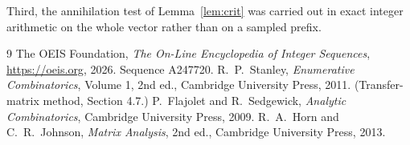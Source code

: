\documentclass[11pt,a4paper]{article}
\theoremstyle{plain}
\theoremstyle{definition}
\begin{document}
Third, the annihilation test of Lemma~\ref{lem:crit} was carried out in exact integer
arithmetic on the whole vector rather than on a sampled prefix.

\begin{thebibliography}{9}
 The OEIS Foundation, \emph{The On-Line Encyclopedia of Integer
Sequences}, \url{https://oeis.org}, 2026. Sequence A247720.
 R.~P.~Stanley, \emph{Enumerative Combinatorics}, Volume 1, 2nd ed.,
Cambridge University Press, 2011. (Transfer-matrix method, Section 4.7.)
 P.~Flajolet and R.~Sedgewick, \emph{Analytic Combinatorics}, Cambridge
University Press, 2009.
 R.~A.~Horn and C.~R.~Johnson, \emph{Matrix Analysis}, 2nd ed., Cambridge
University Press, 2013.
\end{thebibliography}
\end{document}
